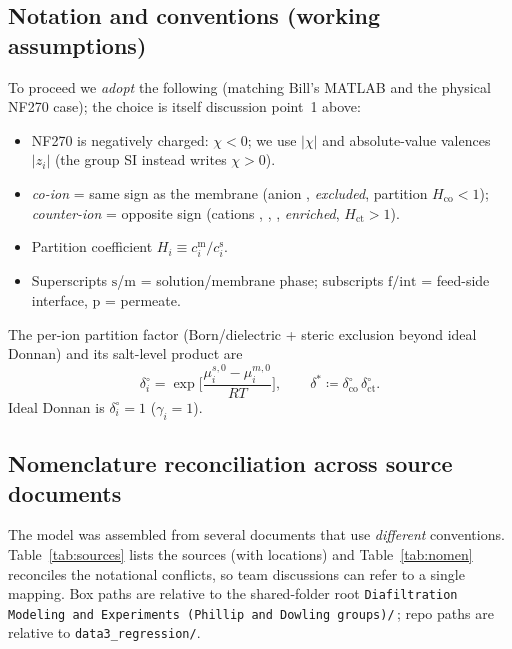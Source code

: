 \documentclass[11pt]{article}
\newcommand{\cm}[1]{{c^{\mathrm{m}}_{#1}}}
\newcommand{\cs}[1]{{c^{\mathrm{s}}_{#1}}}
\newcommand{\co}{\mathrm{co}}
\newcommand{\ct}{\mathrm{ct}}
\newcommand{\dstar}{\delta^{*}}
\begin{document}
\subsection{Notation and conventions (working assumptions)}\label{sec:conventions}
To proceed we \emph{adopt} the following (matching Bill's MATLAB and the physical
NF270 case); the choice is itself discussion point~1 above:
\begin{itemize}[itemsep=1pt]
  \item NF270 is negatively charged: $\chi<0$; we use $|\chi|$ and absolute-value
        valences $|z_i|$ (the group SI instead writes $\chi>0$).
  \item \emph{co-ion} = same sign as the membrane (anion , \emph{excluded},
        partition $H_\co<1$); \emph{counter-ion} = opposite sign (cations
        , , , \emph{enriched}, $H_\ct>1$).
  \item Partition coefficient $H_i \equiv \cm{i}/\cs{i}$.
  \item Superscripts $\mathrm{s}$/$\mathrm{m}$ = solution/membrane phase;
        subscripts $\mathrm{f/int}$ = feed-side interface, $\mathrm{p}$ = permeate.
\end{itemize}
The per-ion partition factor (Born/dielectric + steric exclusion beyond ideal
Donnan) and its salt-level product are
\begin{equation}
  \delta^{\circ}_i = \exp\!\Big[\frac{\mu^{s,0}_i-\mu^{m,0}_i}{RT}\Big],
  \qquad
  \dstar \coloneqq \delta^{\circ}_{\co}\,\delta^{\circ}_{\ct}.
  \label{eq:deltadef}
\end{equation}
Ideal Donnan is $\delta^{\circ}_i=1$ ($\gamma_i=1$).

\subsection{Nomenclature reconciliation across source documents}\label{sec:nomen}
The model was assembled from several documents that use \emph{different}
conventions. Table~\ref{tab:sources} lists the sources (with locations) and
Table~\ref{tab:nomen} reconciles the notational conflicts, so team discussions can
refer to a single mapping. Box paths are relative to the shared-folder root
\texttt{Diafiltration Modeling and Experiments (Phillip and Dowling groups)/}\,;
repo paths are relative to \texttt{data3\_regression/}.
\end{document}
